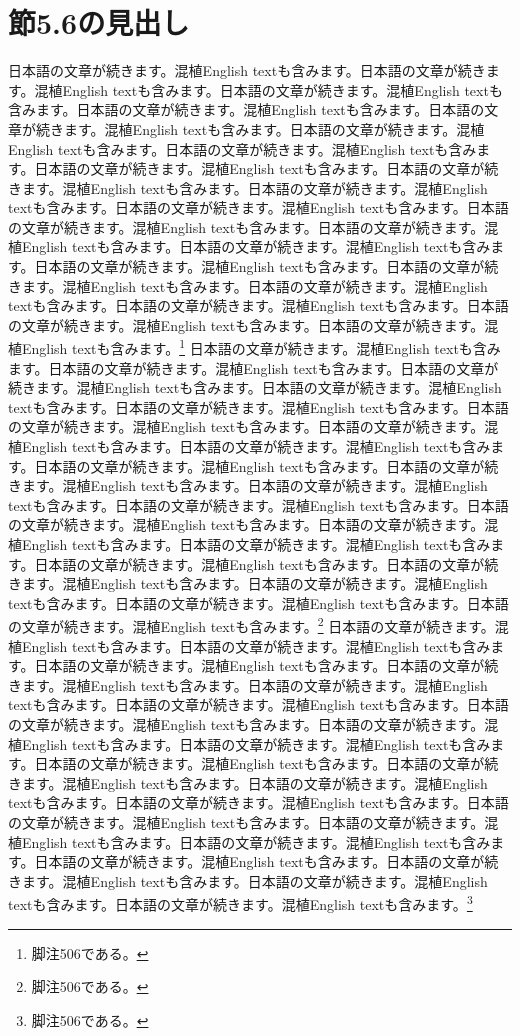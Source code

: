 \documentclass[pdflatex,book]{jlreq}
\begin{document}
\section{節5.6の見出し}
日本語の文章が続きます。混植English textも含みます。日本語の文章が続きます。混植English textも含みます。日本語の文章が続きます。混植English textも含みます。日本語の文章が続きます。混植English textも含みます。日本語の文章が続きます。混植English textも含みます。日本語の文章が続きます。混植English textも含みます。日本語の文章が続きます。混植English textも含みます。日本語の文章が続きます。混植English textも含みます。日本語の文章が続きます。混植English textも含みます。日本語の文章が続きます。混植English textも含みます。日本語の文章が続きます。混植English textも含みます。日本語の文章が続きます。混植English textも含みます。日本語の文章が続きます。混植English textも含みます。日本語の文章が続きます。混植English textも含みます。日本語の文章が続きます。混植English textも含みます。日本語の文章が続きます。混植English textも含みます。日本語の文章が続きます。混植English textも含みます。日本語の文章が続きます。混植English textも含みます。日本語の文章が続きます。混植English textも含みます。日本語の文章が続きます。混植English textも含みます。\footnote{脚注506である。}
日本語の文章が続きます。混植English textも含みます。日本語の文章が続きます。混植English textも含みます。日本語の文章が続きます。混植English textも含みます。日本語の文章が続きます。混植English textも含みます。日本語の文章が続きます。混植English textも含みます。日本語の文章が続きます。混植English textも含みます。日本語の文章が続きます。混植English textも含みます。日本語の文章が続きます。混植English textも含みます。日本語の文章が続きます。混植English textも含みます。日本語の文章が続きます。混植English textも含みます。日本語の文章が続きます。混植English textも含みます。日本語の文章が続きます。混植English textも含みます。日本語の文章が続きます。混植English textも含みます。日本語の文章が続きます。混植English textも含みます。日本語の文章が続きます。混植English textも含みます。日本語の文章が続きます。混植English textも含みます。日本語の文章が続きます。混植English textも含みます。日本語の文章が続きます。混植English textも含みます。日本語の文章が続きます。混植English textも含みます。日本語の文章が続きます。混植English textも含みます。\footnote{脚注506である。}
日本語の文章が続きます。混植English textも含みます。日本語の文章が続きます。混植English textも含みます。日本語の文章が続きます。混植English textも含みます。日本語の文章が続きます。混植English textも含みます。日本語の文章が続きます。混植English textも含みます。日本語の文章が続きます。混植English textも含みます。日本語の文章が続きます。混植English textも含みます。日本語の文章が続きます。混植English textも含みます。日本語の文章が続きます。混植English textも含みます。日本語の文章が続きます。混植English textも含みます。日本語の文章が続きます。混植English textも含みます。日本語の文章が続きます。混植English textも含みます。日本語の文章が続きます。混植English textも含みます。日本語の文章が続きます。混植English textも含みます。日本語の文章が続きます。混植English textも含みます。日本語の文章が続きます。混植English textも含みます。日本語の文章が続きます。混植English textも含みます。日本語の文章が続きます。混植English textも含みます。日本語の文章が続きます。混植English textも含みます。日本語の文章が続きます。混植English textも含みます。\footnote{脚注506である。}
\end{document}
